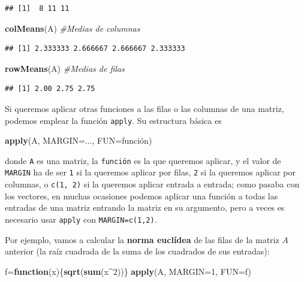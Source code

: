 \documentclass[]{book}
\newenvironment{Shaded}{\begin{snugshade}}{\end{snugshade}}
\newcommand{\CommentTok}[1]{\textcolor[rgb]{0.56,0.35,0.01}{\textit{#1}}}
\newcommand{\ControlFlowTok}[1]{\textcolor[rgb]{0.13,0.29,0.53}{\textbf{#1}}}
\newcommand{\DataTypeTok}[1]{\textcolor[rgb]{0.13,0.29,0.53}{#1}}
\newcommand{\DecValTok}[1]{\textcolor[rgb]{0.00,0.00,0.81}{#1}}
\newcommand{\KeywordTok}[1]{\textcolor[rgb]{0.13,0.29,0.53}{\textbf{#1}}}
\newcommand{\NormalTok}[1]{#1}
\newcommand{\OperatorTok}[1]{\textcolor[rgb]{0.81,0.36,0.00}{\textbf{#1}}}
\theoremstyle{definition}
\theoremstyle{definition}
\theoremstyle{definition}
\theoremstyle{remark}
\begin{document}
\begin{verbatim}
## [1]  8 11 11
\end{verbatim}

\begin{Shaded}
\begin{Highlighting}[]
\KeywordTok{colMeans}\NormalTok{(A)  }\CommentTok{#Medias de columnas}
\end{Highlighting}
\end{Shaded}

\begin{verbatim}
## [1] 2.333333 2.666667 2.666667 2.333333
\end{verbatim}

\begin{Shaded}
\begin{Highlighting}[]
\KeywordTok{rowMeans}\NormalTok{(A)  }\CommentTok{#Medias de filas}
\end{Highlighting}
\end{Shaded}

\begin{verbatim}
## [1] 2.00 2.75 2.75
\end{verbatim}

Si queremos aplicar otras funciones a las filas o las columnas de una matriz, podemos emplear la función \texttt{apply}. Su estructura básica es

\begin{Shaded}
\begin{Highlighting}[]
\KeywordTok{apply}\NormalTok{(A, }\DataTypeTok{MARGIN=}\NormalTok{..., }\DataTypeTok{FUN=}\NormalTok{función)}
\end{Highlighting}
\end{Shaded}

donde \texttt{A} es una matriz, la \texttt{función} es la que queremos aplicar,
y el valor de \texttt{MARGIN} ha de ser \texttt{1} si la queremos aplicar por filas, \texttt{2} si la queremos aplicar por columnas, o \texttt{c(1,\ 2)} si la queremos aplicar entrada a entrada; como pasaba con los vectores, en muchas ocasiones podemos aplicar una función a todas las entradas de una matriz entrando la matriz en su argumento, pero a veces es necesario usar \texttt{apply} con \texttt{MARGIN=c(1,2)}.

Por ejemplo, vamos a calcular la \textbf{norma euclídea} de las filas de la matriz \(A\) anterior (la raíz cuadrada de la suma de los cuadrados de sus entradas):

\begin{Shaded}
\begin{Highlighting}[]
\NormalTok{f=}\ControlFlowTok{function}\NormalTok{(x)\{}\KeywordTok{sqrt}\NormalTok{(}\KeywordTok{sum}\NormalTok{(x}\OperatorTok{^}\DecValTok{2}\NormalTok{))\}}
\KeywordTok{apply}\NormalTok{(A, }\DataTypeTok{MARGIN=}\DecValTok{1}\NormalTok{, }\DataTypeTok{FUN=}\NormalTok{f)  }
\end{Highlighting}
\end{Shaded}
\end{document}
